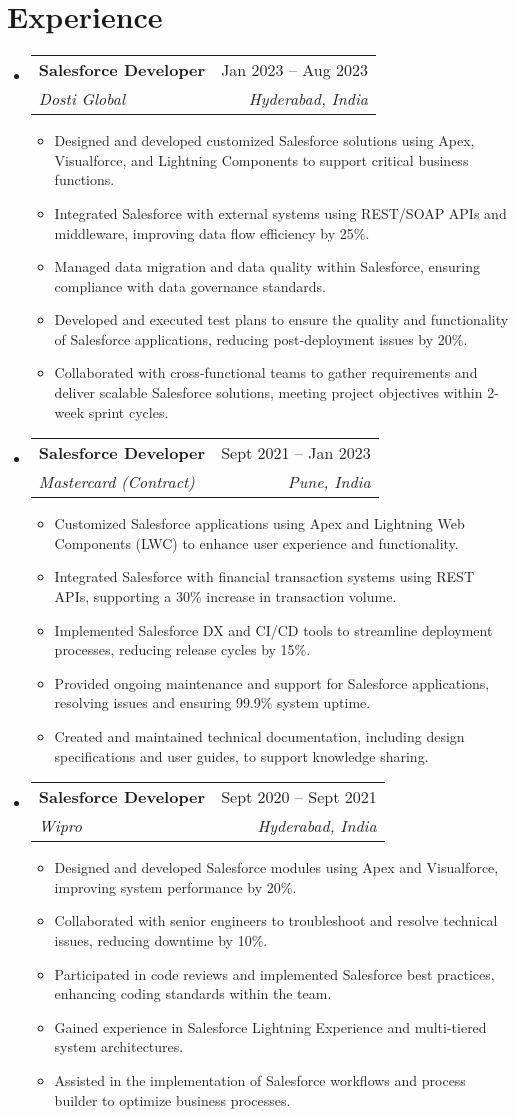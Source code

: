 \documentclass{article}
\makeatletter
\newcommand{\resumeItem}[1]{
  \item\small{
    {#1 \vspace{-2pt}}
  }
}
\newcommand{\resumeSubheading}[4]{
  \vspace{-2pt}\item
    \begin{tabular*}{0.97\textwidth}[t]{l@{\extracolsep{\fill}}r}
      \textbf{#1} & #2 \\
      \textit{\small#3} & \textit{\small #4} \\
    \end{tabular*}\vspace{-7pt}
}
\newcommand{\resumeSubHeadingListStart}{\begin{itemize}[leftmargin=0.15in, label={}]}
\newcommand{\resumeSubHeadingListEnd}{\end{itemize}}
\newcommand{\resumeItemListStart}{\begin{itemize}}
\newcommand{\resumeItemListEnd}{\end{itemize}\vspace{-5pt}}
\makeatother
\begin{document}
\section{Experience}
\resumeSubHeadingListStart
\resumeSubheading
{Salesforce Developer}{Jan 2023 – Aug 2023}
{Dosti Global}{Hyderabad, India}
\resumeItemListStart
\resumeItem{Designed and developed customized Salesforce solutions using Apex, Visualforce, and Lightning Components to support critical business functions.}
\resumeItem{Integrated Salesforce with external systems using REST/SOAP APIs and middleware, improving data flow efficiency by 25\%.}
\resumeItem{Managed data migration and data quality within Salesforce, ensuring compliance with data governance standards.}
\resumeItem{Developed and executed test plans to ensure the quality and functionality of Salesforce applications, reducing post-deployment issues by 20\%.}
\resumeItem{Collaborated with cross-functional teams to gather requirements and deliver scalable Salesforce solutions, meeting project objectives within 2-week sprint cycles.}
\resumeItemListEnd
\resumeSubheading
{Salesforce Developer}{Sept 2021 – Jan 2023}
{Mastercard (Contract)}{Pune, India}
\resumeItemListStart
\resumeItem{Customized Salesforce applications using Apex and Lightning Web Components (LWC) to enhance user experience and functionality.}
\resumeItem{Integrated Salesforce with financial transaction systems using REST APIs, supporting a 30\% increase in transaction volume.}
\resumeItem{Implemented Salesforce DX and CI/CD tools to streamline deployment processes, reducing release cycles by 15\%.}
\resumeItem{Provided ongoing maintenance and support for Salesforce applications, resolving issues and ensuring 99.9\% system uptime.}
\resumeItem{Created and maintained technical documentation, including design specifications and user guides, to support knowledge sharing.}
\resumeItemListEnd
\resumeSubheading
{Salesforce Developer}{Sept 2020 – Sept 2021}
{Wipro}{Hyderabad, India}
\resumeItemListStart
\resumeItem{Designed and developed Salesforce modules using Apex and Visualforce, improving system performance by 20\%.}
\resumeItem{Collaborated with senior engineers to troubleshoot and resolve technical issues, reducing downtime by 10\%.}
\resumeItem{Participated in code reviews and implemented Salesforce best practices, enhancing coding standards within the team.}
\resumeItem{Gained experience in Salesforce Lightning Experience and multi-tiered system architectures.}
\resumeItem{Assisted in the implementation of Salesforce workflows and process builder to optimize business processes.}
\resumeItemListEnd
\resumeSubHeadingListEnd
\end{document}

